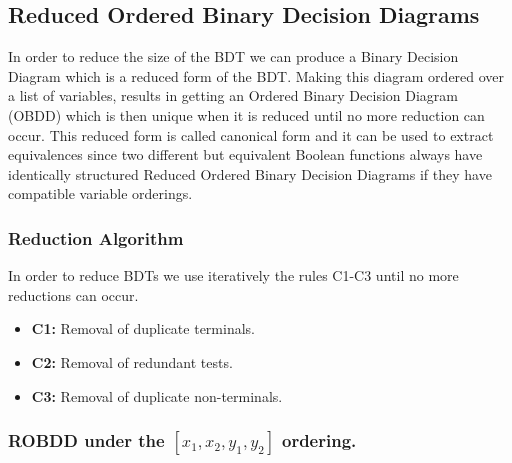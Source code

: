 \documentclass[a4paper,10pt]{article}
\begin{document}
\subsection*{Reduced Ordered Binary Decision Diagrams}
In order to reduce the size of the BDT we can produce a 
Binary Decision Diagram which is a reduced form of the BDT.
Making this diagram ordered over a list of variables, results in getting an Ordered Binary Decision Diagram (OBDD) which is
then unique when it is reduced until no more reduction can occur. This reduced form is called canonical form and it can be used to
extract equivalences since two different but equivalent Boolean functions always have identically structured Reduced Ordered Binary Decision Diagrams 
if they have compatible variable orderings.
\subsubsection*{Reduction Algorithm}
\noindent In order to reduce BDTs we use iteratively the rules C1-C3 until no more reductions can occur.

\begin{itemize}
\item {\bf C1:} Removal of duplicate terminals. 
\item {\bf C2:} Removal of redundant tests. 
\item {\bf C3:} Removal of duplicate non-terminals. 
\end{itemize}




\subsubsection*{ROBDD under the $[x_1,x_2,y_1,y_2]$ ordering.}
\end{document}
